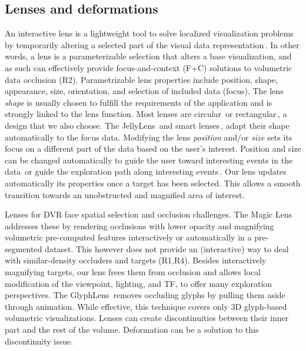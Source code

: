 \subsection{Lenses and deformations}
%
An interactive lens is a lightweight tool to solve localized visualization problems by temporarily altering a selected part of the visual data representation\,\cite{CGF:CGF12871}. In other words, a lens is a parameterizable selection that alters a base visualization, and as such can effectively provide focus-and-context (F+C) solutions to volumetric data occlusion (R2). Parametrizable lens properties include position, shape, appearance, size, orientation, and selection of included data (focus). The lens \emph{shape} is usually chosen to fulfill the requirements of the application and is strongly linked to the lens function. Most lenses are circular\,\cite{1648236} or rectangular\,\cite{Kincaid:2010:SFA:1907651.1907963}, a design that we also choose. The JellyLens\,\cite{Pindat:2012:JCA:2380116.2380150} and smart lenses\,\cite{Thiede2008}, adapt their shape automatically to the focus data. Modifying the lens \emph{position} and/or \emph{size} sets its focus on a different part of the data based on the user's interest. Position and size can be changed automatically to guide the user toward interesting events in the data\,\cite{Tominski:2011:ECU:2336207.2336211} or guide the exploration path along interesting events\,\cite{Alvina:2014:RER:2598153.2598200}. Our lens updates automatically its properties once a target has been selected. This allows a smooth transition towards an unobstructed and magnified area of interest.

Lenses for DVR face spatial selection and occlusion challenges. The Magic Lens\,\cite{1532818} addresses these by rendering occlusions with lower opacity and magnifying volumetric pre-computed features interactively or automatically in a pre-segmented dataset. This however does not provide an (interactive) way to deal with similar-density occluders and targets (R1,R4). Besides interactively magnifying targets, our lens frees them from occlusion and allows local modification of the viewpoint, lighting, and TF, to offer many exploration perspectives. The GlyphLens\,\cite{7539643} removes occluding glyphs by pulling them aside through animation. While effective, this technique covers only 3D glyph-based volumetric visualizations. Lenses can create discontinuities between their inner part and the rest of the volume. Deformation can be a solution to this discontinuity issue.

